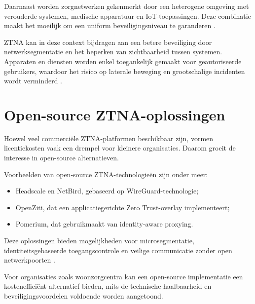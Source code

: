 Daarnaast worden zorgnetwerken gekenmerkt door een heterogene omgeving met verouderde systemen, medische apparatuur en IoT-toepassingen. Deze combinatie maakt het moeilijk om een uniform beveiligingsniveau te garanderen \autocite{anacyber2024}.

ZTNA kan in deze context bijdragen aan een betere beveiliging door netwerksegmentatie en het beperken van zichtbaarheid tussen systemen. Apparaten en diensten worden enkel toegankelijk gemaakt voor geautoriseerde gebruikers, waardoor het risico op laterale beweging en grootschalige incidenten wordt verminderd \autocite{appgate2023}.

\section{Open-source ZTNA-oplossingen}

Hoewel veel commerciële ZTNA-platformen beschikbaar zijn, vormen licentiekosten vaak een drempel voor kleinere organisaties. Daarom groeit de interesse in open-source alternatieven.

Voorbeelden van open-source ZTNA-technologieën zijn onder meer:
\begin{itemize}
	\item Headscale en NetBird, gebaseerd op WireGuard-technologie;
	\item OpenZiti, dat een applicatiegerichte Zero Trust-overlay implementeert;
	\item Pomerium, dat gebruikmaakt van identity-aware proxying.
\end{itemize}

Deze oplossingen bieden mogelijkheden voor microsegmentatie, identiteitsgebaseerde toegangscontrole en veilige communicatie zonder open netwerkpoorten \autocite{aimultiple2025}.

Voor organisaties zoals woonzorgcentra kan een open-source implementatie een kostenefficiënt alternatief bieden, mits de technische haalbaarheid en beveiligingsvoordelen voldoende worden aangetoond.





